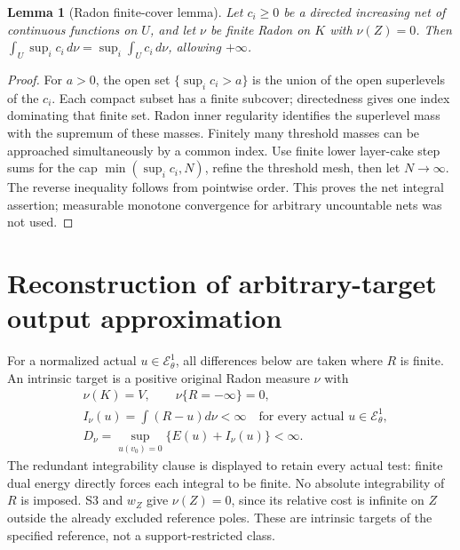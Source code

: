 \documentclass[10pt]{article}
\newtheorem{lemma}[theorem]{Lemma}
\newcommand{\E}{\mathcal E}
\begin{document}
\begin{lemma}[Radon finite-cover lemma]\label{radon}
Let $c_i\geq0$ be a directed increasing net of continuous functions on
$U$, and let $\nu$ be finite Radon on $K$ with $\nu(Z)=0$.
Then $\int_U\sup_i c_i\,d\nu=\sup_i\int_U c_i\,d\nu$,
allowing $+\infty$.
\end{lemma}
\begin{proof}
For $a>0$, the open set $\{\sup_i c_i>a\}$ is the union of the open
superlevels of the $c_i$. Each compact subset has a finite subcover;
directedness gives one index dominating that finite set. Radon inner
regularity identifies the superlevel mass with the supremum of these
masses. Finitely many threshold masses can be approached simultaneously
by a common index. Use finite lower layer-cake step sums for the cap
$\min(\sup_i c_i,N)$, refine the threshold mesh, then let $N\to\infty$.
The reverse inequality follows from pointwise order. This proves the
net integral assertion; measurable monotone convergence for arbitrary
uncountable nets was not used.
\end{proof}

\section{Reconstruction of arbitrary-target output approximation}\label{target-approx}
For a normalized actual $u\in\E^1_\theta$, all differences below are
taken where $R$ is finite. An intrinsic target is a positive original
Radon measure $\nu$ with
\begin{equation}\label{target}
 \begin{aligned}
 &\nu(K)=V,\qquad\nu\{R=-\infty\}=0,\\
 &I_\nu(u)=\int(R-u)d\nu<\infty\quad\text{for every actual }u\in\E^1_\theta,\\
 &D_\nu=\sup_{u(v_0)=0}\{E(u)+I_\nu(u)\}<\infty.
 \end{aligned}
\end{equation}
The redundant integrability clause is displayed to retain every actual
test: finite dual energy directly forces each integral to be finite.
No absolute integrability of $R$ is imposed. S3 and $w_Z$ give
$\nu(Z)=0$, since its relative cost is infinite on $Z$ outside the
already excluded reference poles. These are intrinsic targets of the
specified reference, not a support-restricted class.
\end{document}
